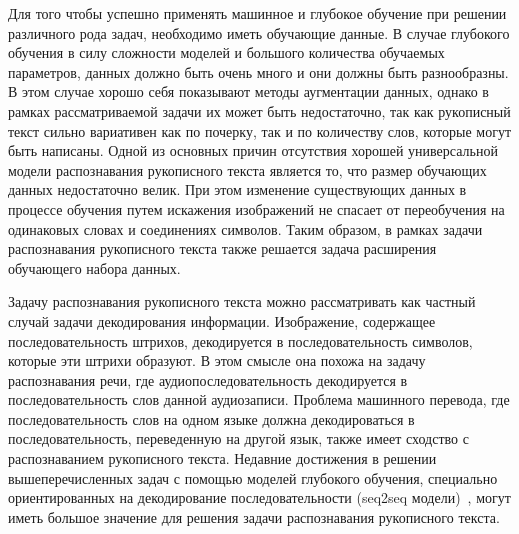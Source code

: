 Для того чтобы успешно применять машинное и глубокое обучение при решении различного рода задач, необходимо иметь обучающие данные.
В случае глубокого обучения в силу сложности моделей и большого количества обучаемых параметров, данных должно быть очень много и они должны быть разнообразны.
В этом случае хорошо себя показывают методы аугментации данных, однако в рамках рассматриваемой задачи их может быть недостаточно,
так как рукописный текст сильно вариативен как по почерку, так и по количеству слов, которые могут быть написаны.
Одной из основных причин отсутствия хорошей универсальной модели распознавания рукописного текста является то, что размер обучающих данных недостаточно велик.
При этом изменение существующих данных в процессе обучения путем искажения изображений не спасает от переобучения на одинаковых словах и соединениях символов.
Таким образом, в рамках задачи распознавания рукописного текста также решается задача расширения обучающего набора данных.

Задачу распознавания рукописного текста можно рассматривать как частный случай задачи декодирования информации.
Изображение, содержащее последовательность штрихов, декодируется в последовательность символов, которые эти штрихи образуют.
В этом смысле она похожа на задачу распознавания речи, где аудиопоследовательность декодируется в последовательность слов данной аудиозаписи.
Проблема машинного перевода, где последовательность слов на одном языке должна декодироваться в последовательность,
переведенную на другой язык, также имеет сходство с распознаванием рукописного текста.
Недавние достижения в решении вышеперечисленных задач с помощью моделей глубокого обучения,
специально ориентированных на декодирование последовательности (seq2seq модели)~\cite{sutskever2014sequence},
могут иметь большое значение для решения задачи распознавания рукописного текста.
